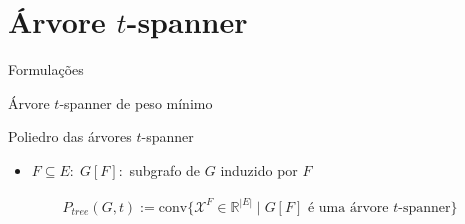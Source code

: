 \documentclass[dvipsnames]{beamer}
\newcommand{\incid}{\mathcal{X}}
\newcommand{\espacoX}{\mathbb{R}^{|E|}}
\newcommand{\spanBridge}{\mathcal{B}}
\newcommand{\BridgeG}{\spanBridge^{t}(G)}
\begin{document}
\section{Árvore $t$-spanner}

\begin{frame}{Formulações}
  \begin{center}
    Árvore $t$-spanner de peso mínimo
  \end{center}
\end{frame}


\begin{frame}{Poliedro das árvores $t$-spanner}
  \begin{itemize}
    \item[] $F \subseteq E: \; G[F]:$ subgrafo de $G$ induzido por $F$
    \end{itemize}
\begin{equation*}
  \begin{split}    
P_{tree}(G,t) :=  \text{conv}\{\incid^{F} \in \espacoX\; |\; \text{$G[F]$ é uma árvore $t$-spanner\}} 
\end{split}
\end{equation*}  
  \end{frame}
\end{document}
